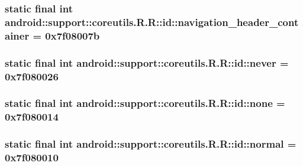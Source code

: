 \hypertarget{classandroid_1_1support_1_1coreutils_1_1_r_1_1id_daffaf9dd813c98535700fbf34674b53}{
\subsubsection[{navigation\_\-header\_\-container}]{\setlength{\rightskip}{0pt plus 5cm}static final int android::support::coreutils.R.R::id::navigation\_\-header\_\-container = 0x7f08007b}}
\label{classandroid_1_1support_1_1coreutils_1_1_r_1_1id_daffaf9dd813c98535700fbf34674b53}


\hypertarget{classandroid_1_1support_1_1coreutils_1_1_r_1_1id_2da5e35182b96e919be018339ced522d}{
\subsubsection[{never}]{\setlength{\rightskip}{0pt plus 5cm}static final int android::support::coreutils.R.R::id::never = 0x7f080026}}
\label{classandroid_1_1support_1_1coreutils_1_1_r_1_1id_2da5e35182b96e919be018339ced522d}


\hypertarget{classandroid_1_1support_1_1coreutils_1_1_r_1_1id_9e892f27c44227ef13423606b15e18d6}{
\subsubsection[{none}]{\setlength{\rightskip}{0pt plus 5cm}static final int android::support::coreutils.R.R::id::none = 0x7f080014}}
\label{classandroid_1_1support_1_1coreutils_1_1_r_1_1id_9e892f27c44227ef13423606b15e18d6}


\hypertarget{classandroid_1_1support_1_1coreutils_1_1_r_1_1id_d4c6fd3a04891bdc3816e25ce530d2ea}{
\subsubsection[{normal}]{\setlength{\rightskip}{0pt plus 5cm}static final int android::support::coreutils.R.R::id::normal = 0x7f080010}}
\label{classandroid_1_1support_1_1coreutils_1_1_r_1_1id_d4c6fd3a04891bdc3816e25ce530d2ea}


